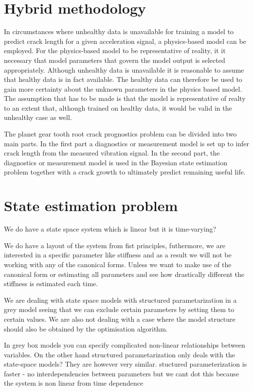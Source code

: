 \section{Hybrid methodology}
In circumstances where unhealthy data is unavailable for training a model to predict crack length for a given acceleration signal, a physics-based model can be employed. For the physics-based model to be representative of reality, it it necessary that model parameters that govern the model output is selected appropriately. Although unhealthy data is unavailable it is reasonable to assume that healthy data is in fact available. The healthy data can therefore be used to gain more certainty about the unknown parameters in the physics based model. The assumption that has to be made is that the model is representative of realty to an extent that, although trained on healthy data, it would be valid in the unhealthy case as well. 

The planet gear tooth root crack prognostics problem can be divided into two main parts. In the first part a diagnostics or measurement model is set up to infer crack length from the measured vibration signal. In the second part, the diagnostics or measurement model is used in the Bayesian state estimation problem together with a crack growth to ultimately predict remaining useful life. 





\section{State estimation problem}
We do have a state space system which is linear but it is time-varying?

We do have a layout of the system from fist principles, futhermore, we are interested in a specific parameter like stiffness and as a result we will not be working with any of the canonical forms. Unless we want to make use of the canonical form or estimating all parameters and see how drastically different the stiffness is estimated each time.

We are dealing with state space models with structured parametarization in a grey model seeing that we can exclude certain parameters by setting them to certain values. We are also not dealing with a case where the model structure should also be obtained by the optimisation algorithm.

In grey box models you can specify complicated non-linear relationships between variables. On the other hand structured parametarization only deals with the state-space models? They are however very similar. stuctured parameterization is faster - no interdependencies between parameters but we cant dot this because the system is non linear from time dependence

